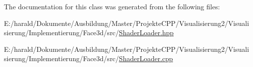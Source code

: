 The documentation for this class was generated from the following files\+:\begin{DoxyCompactItemize}
\item 
E\+:/harald/\+Dokumente/\+Ausbildung/\+Master/\+Projekte\+C\+P\+P/\+Visualisierung2/\+Visualisierung/\+Implementierung/\+Face3d/src/\hyperlink{_shader_loader_8hpp}{Shader\+Loader.\+hpp}\item 
E\+:/harald/\+Dokumente/\+Ausbildung/\+Master/\+Projekte\+C\+P\+P/\+Visualisierung2/\+Visualisierung/\+Implementierung/\+Face3d/src/\hyperlink{_shader_loader_8cpp}{Shader\+Loader.\+cpp}\end{DoxyCompactItemize}
